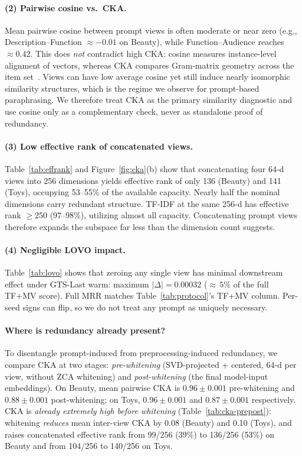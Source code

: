 \documentclass[sigconf,natbib=true,anonymous]{acmart}
\newcommand{\tfmv}{\textsc{TF+MV}\xspace}
\begin{document}
\paragraph{(2) Pairwise cosine vs.\ CKA.}
Mean pairwise cosine between prompt views is often moderate or near zero (e.g., Description--Function $\approx -0.01$ on Beauty), while Function--Audience reaches $\approx 0.42$.
This does \emph{not} contradict high CKA: cosine measures instance-level alignment of vectors, whereas CKA compares Gram-matrix geometry across the item set~\cite{kornblith2019cka}.
Views can have low average cosine yet still induce nearly isomorphic similarity structures, which is the regime we observe for prompt-based paraphrasing.
We therefore treat CKA as the primary similarity diagnostic and use cosine only as a complementary check, never as standalone proof of redundancy.

\paragraph{(3) Low effective rank of concatenated views.}
Table~\ref{tab:effrank} and Figure~\ref{fig:cka}(b) show that concatenating four 64-d views into 256 dimensions yields effective rank of only 136 (Beauty) and 141 (Toys), occupying 53--55\% of the available capacity.
Nearly half the nominal dimensions carry redundant structure.
TF-IDF at the same 256-d has effective rank $\ge$250 (97--98\%), utilizing almost all capacity.
Concatenating prompt views therefore expands the subspace far less than the dimension count suggests.

\paragraph{(4) Negligible LOVO impact.}
Table~\ref{tab:lovo} shows that zeroing any single view has minimal downstream effect under GTS-Last warm: maximum $|\Delta|{=}0.00032$ (${\approx}\,5\%$ of the full \tfmv score).
Full MRR matches Table~\ref{tab:protocol}'s \tfmv column.
Per-seed signs can flip, so we do not treat any prompt as uniquely necessary.

\paragraph{Where is redundancy already present?}
To disentangle prompt-induced from preprocessing-induced redundancy, we compare CKA at two stages: \emph{pre-whitening} (SVD-projected + centered, 64-d per view, without ZCA whitening) and \emph{post-whitening} (the final model-input embeddings).
On Beauty, mean pairwise CKA is $0.96\pm0.001$ pre-whitening and $0.88\pm0.001$ post-whitening; on Toys, $0.96\pm0.001$ and $0.87\pm0.001$ respectively.
CKA is \emph{already extremely high before whitening} (Table~\ref{tab:cka-prepost}): whitening \emph{reduces} mean inter-view CKA by 0.08 (Beauty) and 0.10 (Toys), and raises concatenated effective rank from 99/256 (39\%) to 136/256 (53\%) on Beauty and from 104/256 to 140/256 on Toys.
\end{document}
